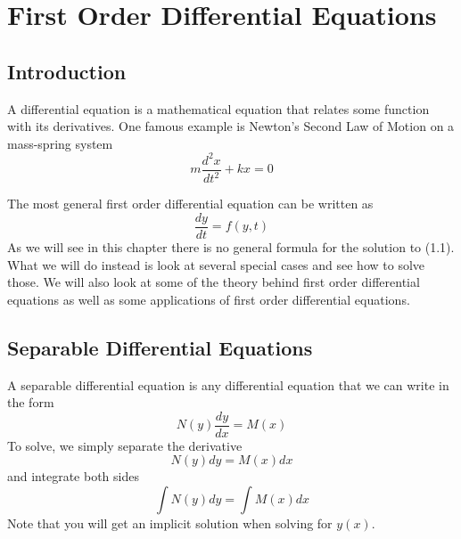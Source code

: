 \documentclass[10pt,reqno]{book}
\title{\myfont{Differential Equations}}
\author{Lukas Zamora}
\date{November 19, 2017}
\theoremstyle{definition}
\begin{document}
	\maketitle

	\tableofcontents

	\chapter{First Order Differential Equations}\normalsize

	\section{Introduction}

	A differential equation is a mathematical equation that relates some function with its derivatives. One famous example is Newton's Second Law of Motion on a mass-spring system
	\[ m \frac{d^2x}{dt^2} + kx = 0  \]

	\noindent The most general first order differential equation can be written as
	\begin{equation}
		\frac{dy}{dt} = f(y,t)
	\end{equation}
	As we will see in this chapter there is no general formula for the solution to (1.1). What we will do instead is look at several special cases and see how to solve those. We will also look at some of the theory behind first order differential equations as well as some applications of first order differential equations.

	\section{Separable Differential Equations}

	A separable differential equation is any differential equation that we can write in the form
	\begin{equation}
		N(y)\frac{dy}{dx} = M(x)
	\end{equation}
	To solve, we simply separate the derivative
	\[ N(y) dy = M(x) dx \]
	and integrate both sides
	\begin{equation}
		\int N(y) dy = \int M(x) dx
	\end{equation}
	Note that you will get an implicit solution when solving for $ y(x) $.
\end{document}
